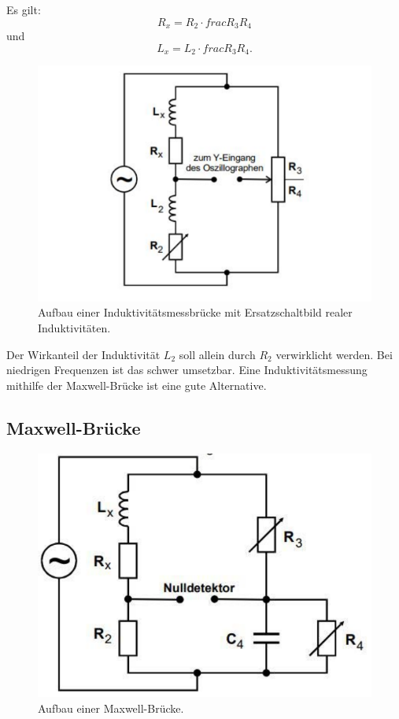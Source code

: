Es gilt:
\begin{equation}
    R_x = R_2 \cdot frac{R_3}{R_4}
\end{equation}
und
\begin{equation}
    L_x = L_2 \cdot frac{R_3}{R_4} .
\end{equation}

\begin{figure}
    \centering
    \includegraphics[width=\textwidth]{InduBruecke.pdf}
    \caption{Aufbau einer Induktivitätsmessbrücke mit Ersatzschaltbild realer Induktivitäten. \cite{anleitung}}
\end{figure}

Der Wirkanteil der Induktivität $L_2$ soll allein durch $R_2$ verwirklicht werden.
Bei niedrigen Frequenzen ist das schwer umsetzbar.
Eine Induktivitätsmessung mithilfe der Maxwell-Brücke ist eine gute Alternative.

\subsection{Maxwell-Brücke}

\begin{figure}
    \centering
    \includegraphics[width=\textwidth]{MaxwellBruecke.pdf}
    \caption{Aufbau einer Maxwell-Brücke. \cite{anleitung}}
    \label{fig:Maxwell}
\end{figure}

